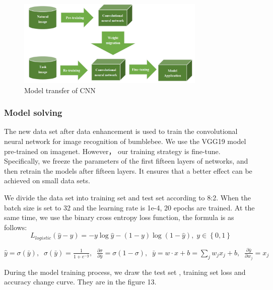 \documentclass{mcmthesis}
\begin{document}
\begin{figure}[H]
	\centering
	\includegraphics[width=0.8\textwidth]{screenshot006}
	\caption{Model transfer of CNN}
	\label{fig:screenshot006}
\end{figure}

\subsubsection{Model solving}
The new data set after data enhancement is used to train the convolutional neural network for image recognition of bumblebee. We use the VGG19 model pre-trained on imagenet. However， our training strategy is fine-tune. Specifically, we freeze the parameters of the first fifteen layers of networks, and then retrain the models after fifteen layers. It ensures that a better effect can be achieved on small data sets.

We divide the data set into training set and test set according to 8:2. 
When the batch size is set to 32 and the learning rate is 1e-4, 20 epochs are trained. At the same time, we use the binary cross entropy loss function, the formula is as follows:
\begin{equation}
	L_{logistic}(\hat{y}-y)=-y\log\hat{y}-(1-y)\log(1-\hat{y}),\; y\in\left\lbrace 0,1\right\rbrace
\end{equation}

$ \hat{y}=\sigma(\bar{y}) ,\;\; \sigma(\bar{y})=\frac{1}{1+e^{-\bar{y}}}  ,\;\; \frac{\partial \sigma}{\partial \bar{y}}=\sigma(1-\sigma)  ,\;\; \bar{y}=w\cdot x +b=\sum_{j}w_jx_j+b ,\;\; \frac{\partial \bar{y}}{\partial w_j}=x_j $

During the model training process, we draw the test set , training set loss and accuracy change curve. They are in the figure 13.
\end{document}
